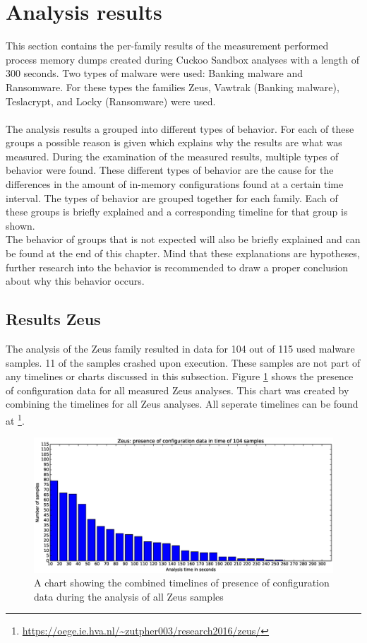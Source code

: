 \documentclass[conference]{IEEEtran}
\begin{document}
\section{Analysis results}
This section contains the per-family results of the measurement performed process memory dumps created during Cuckoo Sandbox analyses with a length of 300 seconds. Two types of malware were used: Banking malware and Ransomware.  For these types the families Zeus, Vawtrak (Banking malware), Teslacrypt, and Locky (Ransomware) were used.\\\\ The analysis results a grouped into different types of behavior. For each of these groups a possible reason is given which explains why the results are what was measured. During the examination of the measured results, multiple types of behavior were found. These different types of behavior are the cause for the differences in the amount of in-memory configurations found at a certain time interval. The types of behavior are grouped together for each family. Each of these groups is briefly explained and a corresponding timeline for that group is shown. \\The behavior of groups that is not expected will also be briefly explained and can be found at the end of this chapter. Mind that these explanations are hypotheses, further research into the behavior is recommended to draw a proper conclusion about why this behavior occurs.


\subsection{Results Zeus}
The analysis of the Zeus family resulted in data for 104 out of 115 used malware samples. 11 of the samples crashed upon execution. These samples are not part of any timelines or charts discussed in this subsection. Figure \ref{fig:zeus-bar} shows the presence of configuration data for all measured Zeus analyses. This chart was created by combining the timelines for all Zeus analyses. All seperate timelines can be found at \footnote{\url{https://oege.ie.hva.nl/~zutpher003/research2016/zeus/}}.\\

\begin{figure}[!h]
	\hspace{-3cm}
    \includegraphics[width=13cm,trim=-95mm 0mm 0mm 9mm, clip=true]{images/zeus/Zeus-barchart.eps}
    \caption{A chart showing the combined timelines of presence of configuration data during the analysis of all Zeus samples}
    \label{fig:zeus-bar}
\end{figure}
\end{document}
